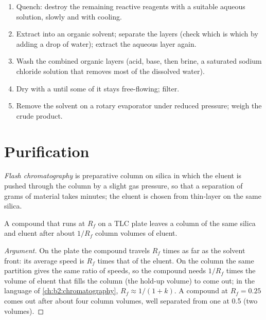 \begin{method}\label{met:b2:lab-techniques-2:work-up}
\begin{enumerate}
  \item Quench: destroy the remaining reactive reagents with a suitable aqueous solution, slowly and with
        cooling.
  \item Extract into an organic solvent; separate the layers (check which is which by adding a drop of
        water); extract the aqueous layer again.
  \item Wash the combined organic layers (acid, base, then brine, a saturated sodium chloride solution
        that removes most of the dissolved water).
  \item Dry with a  until some of it stays free-flowing; filter.
  \item Remove the solvent on a rotary evaporator under reduced pressure; weigh the crude product.
\end{enumerate}
\end{method}

\section{Purification}

\begin{definition}\label{def:b2:lab-techniques-2:flash}
\emph{Flash chromatography} is preparative column  on silica in
which the eluent is pushed through the column by a slight gas pressure, so that a separation of grams
of material takes minutes; the eluent is chosen from thin-layer  on the same silica.
\end{definition}

\begin{proposition}\label{prop:b2:lab-techniques-2:column-volumes}
A compound that runs at $R_f$ on a TLC plate leaves a column of the same silica and eluent after
about $1/R_f$ column volumes of eluent.
\end{proposition}

\begin{proof}[Argument]
On the plate the compound travels $R_f$ times as far as the solvent front: its average speed is $R_f$
times that of the eluent. On the column the same partition gives the same ratio of speeds, so the
compound needs $1/R_f$ times the volume of eluent that fills the column (the hold-up volume) to come
out; in the language of \cref{ch:b2:chromatography}, $R_f \approx 1/(1 + k)$. A compound at $R_f = 0.25$
comes out after about four column volumes, well separated from one at 0.5 (two volumes).
\end{proof}


